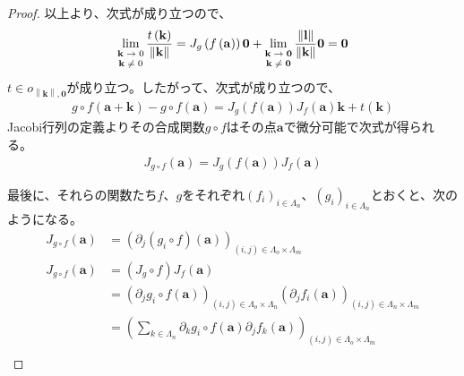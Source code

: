 \documentclass[dvipdfmx]{jsarticle}
\begin{document}
\begin{proof}
以上より、次式が成り立つので、
\begin{align*}
\lim_{\scriptsize \begin{matrix}
\mathbf{k} \rightarrow 0 \\
\mathbf{k} \neq 0 \\
\end{matrix}}\frac{t\left( \mathbf{k} \right)}{\left\| \mathbf{k} \right\|} = J_{g}\left( f\left( \mathbf{a} \right) \right)\mathbf{0} + \lim_{\scriptsize \begin{matrix}
\mathbf{k} \rightarrow \mathbf{0} \\
\mathbf{k} \neq \mathbf{0} \\
\end{matrix}}\frac{\left\| \mathbf{l} \right\|}{\left\| \mathbf{k} \right\|}\mathbf{0} = \mathbf{0}
\end{align*}
$t \in o_{\left\| \mathbf{k} \right\|,\mathbf{0}}$が成り立つ。したがって、次式が成り立つので、
\begin{align*}
g \circ f\left( \mathbf{a} + \mathbf{k} \right) - g \circ f\left( \mathbf{a} \right) = J_{g}\left( f\left( \mathbf{a} \right) \right)J_{f}\left( \mathbf{a} \right)\mathbf{k} + t\left( \mathbf{k} \right)
\end{align*}
Jacobi行列の定義よりその合成関数$g \circ f$はその点$\mathbf{a}$で微分可能で次式が得られる。
\begin{align*}
J_{g \circ f}\left( \mathbf{a} \right) = J_{g}\left( f\left( \mathbf{a} \right) \right)J_{f}\left( \mathbf{a} \right)
\end{align*}\par
最後に、それらの関数たち$f$、$g$をそれぞれ$\left( f_{i} \right)_{i \in \varLambda_{n}}$、$\left( g_{i} \right)_{i \in \varLambda_{n}}$とおくと、次のようになる。
\begin{align*}
J_{g \circ f}\left( \mathbf{a} \right) &= \left( \partial_{j}\left( g_{i} \circ f \right)\left( \mathbf{a} \right) \right)_{(i,j) \in \varLambda_{o} \times \varLambda_{m}}\\
J_{g \circ f}\left( \mathbf{a} \right) &= \left( J_{g} \circ f \right)J_{f}\left( \mathbf{a} \right)\\
&= \left( \partial_{j}g_{i} \circ f\left( \mathbf{a} \right) \right)_{(i,j) \in \varLambda_{o} \times \varLambda_{n}}\left( \partial_{j}f_{i}\left( \mathbf{a} \right) \right)_{(i,j) \in \varLambda_{n} \times \varLambda_{m}}\\
&= \left( \sum_{k \in \varLambda_{n}} {\partial_{k}g_{i} \circ f\left( \mathbf{a} \right)}\partial_{j}f_{k}\left( \mathbf{a} \right) \right)_{(i,j) \in \varLambda_{o} \times \varLambda_{m}}\\

\end{align*}
\end{proof}
\end{document}
